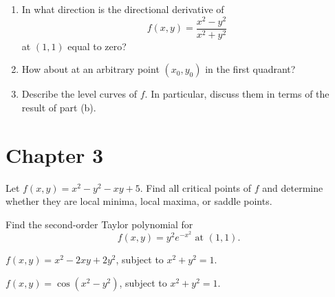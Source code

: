 \documentclass[openany]{book}
\begin{document}
\begin{prob}[59]
    \begin{enumerate}
        \item[(a)] In what direction is the directional derivative of  
        \[
        f(x, y) = \frac{x^2 - y^2}{x^2 + y^2}
        \]
        at \((1, 1)\) equal to zero?  
        \item[(b)] How about at an arbitrary point \((x_0, y_0)\) in the first quadrant?  
        \item[(c)] Describe the level curves of \(f\). In particular, discuss them in terms of the result of part (b).
    \end{enumerate}
\end{prob}





\section{Chapter 3}
\begin{prob}[3]
    Let \( f(x, y) = x^2 - y^2 - xy + 5 \). Find all critical points of \( f \) and determine whether they are local minima, local maxima, or saddle points.
\end{prob}

\begin{prob}[5]
    Find the second-order Taylor polynomial for  
    \[
    f(x, y) = y^2 e^{-x^2} \text{ at } (1, 1).
    \]
\end{prob}

\begin{prob}[15]
    \( f(x, y) = x^2 - 2xy + 2y^2 \), subject to \( x^2 + y^2 = 1 \).
\end{prob}

\begin{prob}[17]
    \( f(x, y) = \cos(x^2 - y^2) \), subject to \( x^2 + y^2 = 1 \).
\end{prob}
\end{document}

